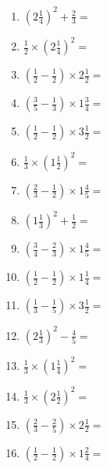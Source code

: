 \documentclass[12pt]{article}
\begin{document}
\begin{enumerate}
\item \large $ \left( 2 \frac{1}{4} \right)^2 + \frac{2}{3} = $ \vspace{1.6cm}
\item \large $ \frac{1}{2} \times \left( 2 \frac{1}{4} \right)^2 = $ \vspace{1.6cm}
\item \large $ \left( \frac{1}{2} - \frac{1}{2} \right) \times 2 \frac{1}{2} = $ \vspace{1.6cm}
\item \large $ \left( \frac{3}{5} - \frac{1}{3} \right) \times 1 \frac{3}{4} = $ \vspace{1.6cm}
\newpage
\item \large $ \left( \frac{1}{2} - \frac{1}{2} \right) \times 3 \frac{1}{2} = $ \vspace{1.6cm}
\item \large $ \frac{1}{3} \times \left( 1 \frac{1}{2} \right)^2 = $ \vspace{1.6cm}
\item \large $ \left( \frac{2}{3} - \frac{1}{2} \right) \times 1 \frac{4}{5} = $ \vspace{1.6cm}
\item \large $ \left( 1 \frac{1}{3} \right)^2 + \frac{1}{2} = $ \vspace{1.6cm}
\item \large $ \left( \frac{3}{4} - \frac{2}{3} \right) \times 1 \frac{4}{5} = $ \vspace{1.6cm}
\item \large $ \left( \frac{1}{2} - \frac{1}{2} \right) \times 1 \frac{1}{4} = $ \vspace{1.6cm}
\item \large $ \left( \frac{1}{3} - \frac{1}{5} \right) \times 3 \frac{1}{2} = $ \vspace{1.6cm}
\item \large $ \left( 2 \frac{1}{3} \right)^2 - \frac{4}{5} = $ \vspace{1.6cm}
\item \large $ \frac{1}{3} \times \left( 1 \frac{1}{4} \right)^2 = $ \vspace{1.6cm}
\item \large $ \frac{1}{3} \times \left( 2 \frac{1}{2} \right)^2 = $ \vspace{1.6cm}
\newpage
\item \large $ \left( \frac{2}{3} - \frac{2}{5} \right) \times 2 \frac{1}{2} = $ \vspace{1.6cm}
\item \large $ \left( \frac{1}{2} - \frac{1}{2} \right) \times 1 \frac{2}{4} = $ \vspace{1.6cm}

\end{enumerate}
\end{document}
